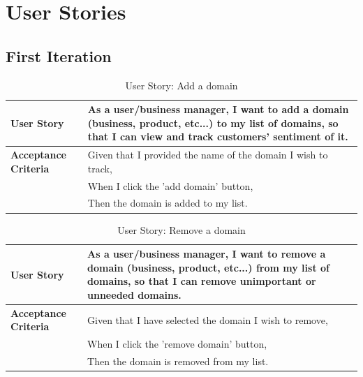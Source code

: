 \documentclass[12pt]{article}
\begin{document}
\section{User Stories}

\subsection{First Iteration}
\begin{table}[htbp]
  \caption{User Story: Add a domain}
  \begin{tabular}{|p{}|p{}|}
    \hline
    \textbf{User Story}          & As a user/business manager, I want to add a domain (business, product, etc...) to my list of domains, so that I can view and track customers' sentiment of it. \\
    \hline
    \textbf{Acceptance Criteria} &
    Given that I provided the name of the domain I wish to track,                                                                                                                                 \\
                                 & When I click the 'add domain' button,                                                                                                                          \\
                                 & Then the domain is added to my list.                                                                                                                           \\
    \hline
  \end{tabular}
\end{table}

\begin{table}[htbp]
  \caption{User Story: Remove a domain}
  \begin{tabular}{|p{}|p{}|}
    \hline
    \textbf{User Story}          & As a user/business manager, I want to remove a domain (business, product, etc...) from my list of domains, so that I can remove unimportant or unneeded domains. \\
    \hline
    \textbf{Acceptance Criteria} &
    Given that I have selected the domain I wish to remove,                                                                                                                                         \\
                                 & When I click the 'remove domain' button,                                                                                                                         \\
                                 & Then the domain is removed from my list.                                                                                                                         \\
    \hline
  \end{tabular}
\end{table}
\end{document}
